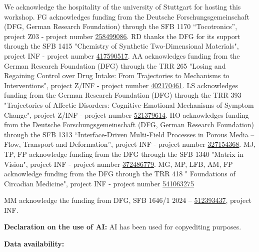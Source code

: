 \documentclass{eceasst}
\newcommand{\geprislink}[1]{\href{https://gepris.dfg.de/gepris/projekt/#1?language=en}{#1}}
\newenvironment{aiuse}{%
  \par\vspace{11pt}%
  \noindent\textbf{Declaration on the use of AI:}\enspace}{%
  \par\vspace{11pt}}
\newenvironment{data}{%
  \par\vspace{11pt}%
  \noindent\textbf{Data availability:}\enspace}{%
  \par\vspace{11pt}}
\begin{document}
\begin{acknowledge}
We acknowledge the hospitality of the university of Stuttgart for hosting this workshop.
FG acknowledges funding from the Deutsche Forschungsgemeinschaft (DFG, German Research Foundation) through the SFB 1170 “Tocotronics”, project Z03 - project number \geprislink{258499086}.
RD thanks the DFG for its support through the SFB 1415 "Chemistry of Synthetic Two-Dimensional Materials", project INF - project number \geprislink{417590517}.
AA acknowledges funding from the German Research Foundation (DFG) through the TRR 265 "Losing and Regaining Control over Drug Intake: From Trajectories to Mechanisms to Interventions", project  Z/INF - project number \geprislink{402170461}.
LS acknowledges funding from the German Research Foundation (DFG) through the TRR 393 "Trajectories of Affectie Disorders: Cognitive-Emotional Mechanisms of Symptom Change", project  Z/INF - project number \geprislink{521379614}.
HO acknowledges funding from the Deutsche Forschungsgemeinschaft (DFG, German Research Foundation) through the SFB 1313 “Interface-Driven Multi-Field Processes in Porous Media – Flow, Transport and Deformation”, project INF - project number \geprislink{327154368}.
MJ, TP, FP acknowledge funding from the DFG through the SFB 1340 "Matrix in Vision", project INF - project number \geprislink{372486779}.
MG, MP, LFB, AM, FP acknowledge funding from the DFG through the TRR 418 " Foundations of Circadian Medicine", project INF - project number \geprislink{541063275}

MM acknowledge the funding from DFG, SFB 1646/1 2024 -- \geprislink{512393437}, project INF. 

\end{acknowledge}

\begin{aiuse}
AI has been used for copyediting purposes.
\end{aiuse}

\begin{data}
\end{data}



\end{document}
